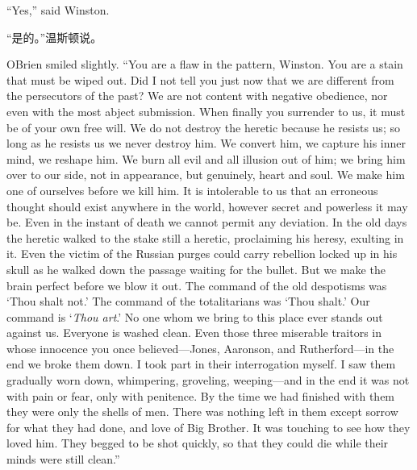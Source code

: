 \begin{paracol}{2}
\switchcolumn*

``Yes,'' said Winston.

\switchcolumn

``是的。''温斯顿说。

\switchcolumn*

O\textquotesingle Brien smiled slightly. ``You are a flaw in the pattern,
Winston. You are a stain that must be wiped out. Did I not tell you just now
that we are different from the persecutors of the past? We are not content
with negative obedience, nor even with the most abject submission. When
finally you surrender to us, it must be of your own free will. We do not
destroy the heretic because he resists us; so long as he resists us we never
destroy him. We convert him, we capture his inner mind, we reshape him. We
burn all evil and all illusion out of him; we bring him over to our side,
not in appearance, but genuinely, heart and soul. We make him one of
ourselves before we kill him. It is intolerable to us that an erroneous
thought should exist anywhere in the world, however secret and powerless it
may be. Even in the instant of death we cannot permit any deviation. In the
old days the heretic walked to the stake still a heretic, proclaiming his
heresy, exulting in it. Even the victim of the Russian purges could carry
rebellion locked up in his skull as he walked down the passage waiting for
the bullet. But we make the brain perfect before we blow it out. The command
of the old despotisms was `Thou shalt not.' The command of the totalitarians
was `Thou shalt.' Our command is `\emph{Thou
  art}.' No one whom we bring to this place ever stands out
against us. Everyone is washed clean. Even those three miserable traitors in
whose innocence you once believed---Jones, Aaronson, and Rutherford---in the
end we broke them down. I took part in their interrogation myself. I saw
them gradually worn down, whimpering, groveling, weeping---and in the end it
was not with pain or fear, only with penitence. By the time we had finished
with them they were only the shells of men. There was nothing left in them
except sorrow for what they had done, and love of Big Brother. It was
touching to see how they loved him. They begged to be shot quickly, so that
they could die while their minds were still clean.''

\switchcolumn


\end{paracol}
